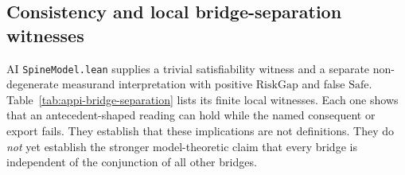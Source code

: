 \subsection{Consistency and local bridge-separation witnesses}
\label{appi:sec:spine-model}
\begin{authbar}{AI}
\texttt{SpineModel.lean} supplies a trivial satisfiability witness and a separate non-degenerate measurand interpretation with positive \(\mathrm{RiskGap}\) and false \(\mathrm{Safe}\). Table~\ref{tab:appi-bridge-separation} lists its finite local witnesses. Each one shows that an antecedent-shaped reading can hold while the named consequent or export fails. They establish that these implications are not definitions. They do \emph{not} yet establish the stronger model-theoretic claim that every bridge is independent of the conjunction of all other bridges.

\end{authbar}
